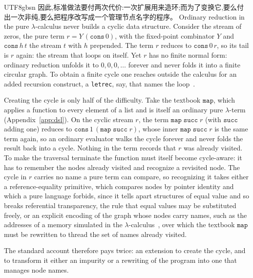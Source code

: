 \begin{CJK*}{UTF8}{gbsn}
  因此,标准做法要付两次代价:一次扩展用来造环;而为了变换它,要么付出一次非纯,要么把程序改写成一个管理节点名字的程序。
  \else
  Ordinary reduction in the pure $\lambda$-calculus never builds a cyclic data structure. Consider the stream of zeros, the pure term $r = Y\,(\mathtt{cons}\,0)$, with the fixed-point combinator $Y$ and $\mathtt{cons}\,h\,t$ the stream $t$ with $h$ prepended. The term $r$ reduces to $\mathtt{cons}\,0\,r$, so its tail is $r$ again: the stream that loops on itself. Yet $r$ has no finite normal form: ordinary reduction unfolds it to $0,0,0,\dots$ forever and never folds it into a finite circular graph. To obtain a finite cycle one reaches outside the calculus for an added recursion construct, a \texttt{letrec}, say, that names the loop~\cite{ariola1997-explicit-recursion}.

  Creating the cycle is only half of the difficulty. Take the textbook $\mathtt{map}$, which applies a function to every element of a list and is itself an ordinary pure $\lambda$-term (Appendix~\ref{app:dsl}). On the cyclic stream $r$, the term $\mathtt{map}\;\mathtt{succ}\;r$ (with $\mathtt{succ}$ adding one) reduces to $\mathtt{cons}\,1\,(\mathtt{map}\;\mathtt{succ}\;r)$, whose inner $\mathtt{map}\;\mathtt{succ}\;r$ is the same term again, so an ordinary evaluator walks the cycle forever and never folds the result back into a cycle. Nothing in the term records that $r$ was already visited. To make the traversal terminate the function must itself become cycle-aware: it has to remember the nodes already visited and recognize a revisited node. The cycle in $r$ carries no name a pure term can compare, so recognizing it takes either a reference-equality primitive, which compares nodes by pointer identity and which a pure language forbids, since it tells apart structures of equal value and so breaks referential transparency, the rule that equal values may be substituted freely, or an explicit encoding of the graph whose nodes carry names, such as the addresses of a memory simulated in the $\lambda$-calculus~\cite{ikuta2022-lambda-8cc}, over which the textbook $\mathtt{map}$ must be rewritten to thread the set of names already visited.

  The standard account therefore pays twice: an extension to create the cycle, and to transform it either an impurity or a rewriting of the program into one that manages node names.
  \fi

  \subsection{}\label{sec:intro-dp}


\end{CJK*}
